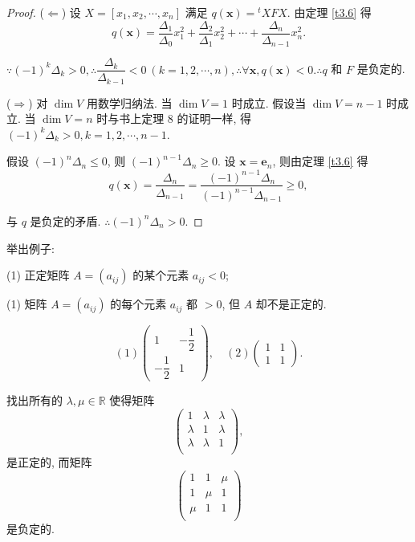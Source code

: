 \documentclass[color=black,device=normal,lang=cn,mode=geye]{elegantnote}
\begin{document}
\begin{proof}
    ($\Leftarrow$) 设 $X=[x_1,x_2,\cdots,x_n]$ 满足 $q(\boldsymbol{x})={}^tXFX$. 由定理 \ref{t3.6} 得
    \[q(\boldsymbol{x})=\dfrac{\Delta_1}{\Delta_0}x_1^2+\dfrac{\Delta_2}{\Delta_1}x_2^2+\cdots+\dfrac{\Delta_n}{\Delta_{n-1}}x_n^2.\]

    $\because(-1)^k\Delta_k>0,\therefore\dfrac{\Delta_k}{\Delta_{k-1}}<0\ (k=1,2,\cdots,n),\therefore\forall\boldsymbol{x},q(\boldsymbol{x})<0.\therefore q$ 和 $F$ 是负定的.

    ($\Rightarrow$) 对 $\dim V$ 用数学归纳法. 当 $\dim V=1$ 时成立. 假设当 $\dim V=n-1$ 时成立. 当 $\dim V=n$ 时与书上定理 8 的证明一样, 得 $(-1)^k\Delta_k>0,k=1,2,\cdots,n-1$.

    假设 $(-1)^n\Delta_n\leq0$, 则 $(-1)^{n-1}\Delta_n\geq0$. 设 $\boldsymbol{x}=\boldsymbol{e}_n$, 则由定理 \ref{t3.6} 得
    \[q(\boldsymbol{x})=\dfrac{\Delta_n}{\Delta_{n-1}}=\dfrac{(-1)^{n-1}\Delta_n}{(-1)^{n-1}\Delta_{n-1}}\geq0,\]

    与 $q$ 是负定的矛盾. $\therefore(-1)^n\Delta_n>0$.
\end{proof}
\begin{exercise}%
    举出例子:
    
    (1) 正定矩阵 $A=(a_{ij})$ 的某个元素 $a_{ij}<0$;

    (1) 矩阵 $A=(a_{ij})$ 的每个元素 $a_{ij}$ 都 $>0$, 但 $A$ 却不是正定的.
\end{exercise}
\begin{solution}
    \[(1)\begin{pmatrix}
        1 & -\dfrac{1}{2} \\
        -\dfrac{1}{2} & 1
    \end{pmatrix},\quad (2)\begin{pmatrix}
        1 & 1 \\
        1 & 1
    \end{pmatrix}.\]
\end{solution}
\begin{exercise}%
    找出所有的 $\lambda,\mu\in\mathbb{R}$ 使得矩阵
    \[\begin{pmatrix}
        1 & \lambda & \lambda \\
        \lambda & 1 & \lambda \\
        \lambda & \lambda & 1 \\
    \end{pmatrix},\]
    是正定的, 而矩阵
    \[\begin{pmatrix}
        1 & 1 & \mu \\
        1 & \mu & 1 \\
        \mu & 1 & 1 \\
    \end{pmatrix}\]
    是负定的.
\end{exercise}
\end{document}
